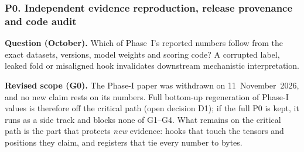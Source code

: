 \documentclass[10pt,a4paper]{article}
\begin{document}
\subsubsection{P0. Independent evidence reproduction, release provenance and code audit}
\label{sec:blockP0}

\textbf{Question (October).} Which of Phase~I's reported numbers follow from the exact datasets, versions, model
weights and scoring code? A corrupted label, leaked fold or misaligned hook invalidates downstream mechanistic
interpretation.

\textbf{Revised scope (G0).} The Phase-I paper was withdrawn on 11~November~2026, and no new claim rests on its
numbers. Full bottom-up regeneration of Phase-I values is therefore off the critical path (open decision D1); if the
full P0 is kept, it runs as a side track and blocks none of G1--G4. What remains on the critical path is the part
that protects \emph{new} evidence: hooks that touch the tensors and positions they claim, and registers that tie
every number to bytes.
\end{document}
